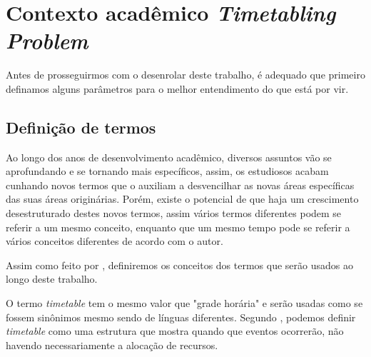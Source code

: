 \chapter{Contexto acadêmico \textit{Timetabling Problem}} %

Antes de prosseguirmos com o desenrolar deste trabalho, é adequado que primeiro definamos alguns parâmetros para o melhor entendimento do que está por vir.


\section{Definição de termos} %

Ao longo dos anos de desenvolvimento acadêmico, diversos assuntos vão se aprofundando e se tornando mais específicos, assim, os estudiosos acabam cunhando novos termos que o auxiliam a desvencilhar as novas áreas específicas das suas áreas originárias. Porém, existe o potencial de que haja um crescimento desestruturado destes novos termos, assim vários termos diferentes podem se referir a um mesmo conceito, enquanto que um mesmo tempo pode se referir a vários conceitos diferentes de acordo com o autor.

Assim como feito por \cite{goos_scheduling_1996}, definiremos os conceitos dos termos que serão usados ao longo deste trabalho.

O termo \textit{timetable} tem o mesmo valor que "grade horária" e serão usadas como se fossem sinônimos mesmo sendo de línguas diferentes. Segundo \cite{goos_scheduling_1996}, podemos definir \textit{timetable} como uma estrutura que mostra quando que eventos ocorrerão, não havendo necessariamente a alocação de recursos.

